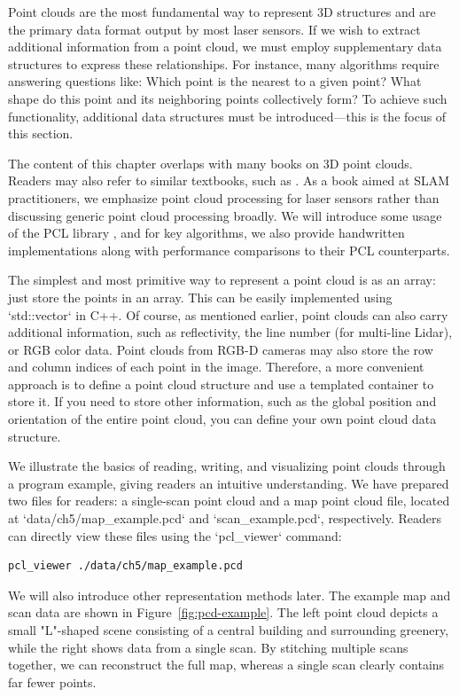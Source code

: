 Point clouds are the most fundamental way to represent 3D structures and are the primary data format output by most laser sensors. If we wish to extract additional information from a point cloud, we must employ supplementary data structures to express these relationships. For instance, many algorithms require answering questions like: Which point is the nearest to a given point? What shape do this point and its neighboring points collectively form? To achieve such functionality, additional data structures must be introduced—this is the focus of this section.  

The content of this chapter overlaps with many books on 3D point clouds. Readers may also refer to similar textbooks, such as \cite{Magnusson2009, GuoHao2019}. As a book aimed at SLAM practitioners, we emphasize point cloud processing for laser sensors rather than discussing generic point cloud processing broadly. We will introduce some usage of the PCL library \cite{Rusu2011}, and for key algorithms, we also provide handwritten implementations along with performance comparisons to their PCL counterparts.  

The simplest and most primitive way to represent a point cloud is as an array: just store the points in an array. This can be easily implemented using `std::vector` in C++. Of course, as mentioned earlier, point clouds can also carry additional information, such as reflectivity, the line number (for multi-line Lidar), or RGB color data. Point clouds from RGB-D cameras may also store the row and column indices of each point in the image. Therefore, a more convenient approach is to define a point cloud structure and use a templated container to store it. If you need to store other information, such as the global position and orientation of the entire point cloud, you can define your own point cloud data structure.  

We illustrate the basics of reading, writing, and visualizing point clouds through a program example, giving readers an intuitive understanding. We have prepared two files for readers: a single-scan point cloud and a map point cloud file, located at `data/ch5/map_example.pcd` and `scan_example.pcd`, respectively. Readers can directly view these files using the `pcl_viewer` command:  
\begin{lstlisting}[language=sh,caption=Terminal input:]  
pcl_viewer ./data/ch5/map_example.pcd  
\end{lstlisting}  

We will also introduce other representation methods later. The example map and scan data are shown in Figure~\ref{fig:pcd-example}. The left point cloud depicts a small "L"-shaped scene consisting of a central building and surrounding greenery, while the right shows data from a single scan. By stitching multiple scans together, we can reconstruct the full map, whereas a single scan clearly contains far fewer points.  

